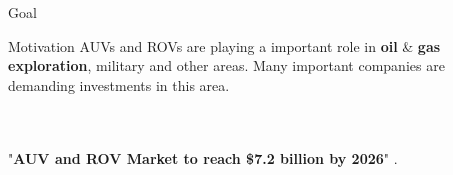 \begin{frame}[c]{Goal} 
    
    \transdissolve[duration=0.5]
   
    \begin{center}
    \end{center}

\end{frame}


\begin{frame}[t]{Motivation} 
  AUVs and ROVs are playing a important role in \textbf{oil} \& \textbf{gas exploration}, military and other areas. Many important companies are demanding investments in this area.

  \newline
  \newline
  \newline
  \newline
  \newline
  \\
  \vspace{1.5cm}
  \\
  "\textbf{AUV and ROV Market to reach \$7.2 billion by 2026}" \cite{reportlinker}.


\end{frame}




    
   
